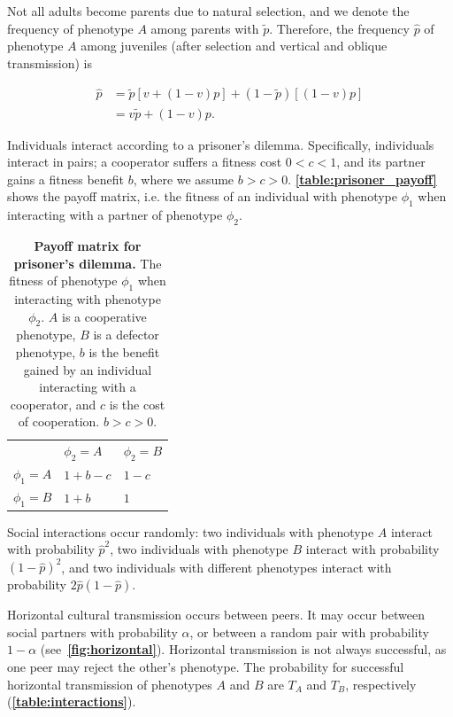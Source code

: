 \documentclass[12pt]{extarticle}
\begin{document}
Not all adults become parents due to natural selection, and we denote the frequency of phenotype $A$ among parents with $\tilde{p}$.
Therefore, the frequency $\hat{p}$ of  phenotype $A$ among juveniles (after selection and vertical and oblique transmission) is

\begin{equation}\label{eq:horizontal}
\begin{aligned}
\hat{p}
& = \tilde{p} [v + (1-v)p] + (1-\tilde{p}) [(1-v)p] \\
& = v \tilde{p} + (1-v) p.
\end{aligned}
\end{equation}

Individuals interact according to a prisoner's dilemma.
Specifically, individuals interact in pairs; a cooperator suffers a fitness cost $0<c<1$, and its partner gains a fitness benefit $b$, where we assume $b>c>0$. \textbf{\autoref{table:prisoner_payoff}} shows the payoff matrix, i.e. the fitness of an individual with phenotype $\phi_1$ when interacting with a partner of phenotype $\phi_2$.

\begin{table}[h]
\centering
\begin{tabular}{lll}
\toprule
           & $\phi_2=A$ & $\phi_2=B$ \\ \cmidrule(r){1-3}
$\phi_1=A$ & $1+b-c$ & $1-c$ \\
$\phi_1=B$ & $1+b$   & $1$
\\ \bottomrule
\end{tabular}
\caption{\textbf{Payoff matrix for prisoner's dilemma.}
The fitness of phenotype $\phi_1$ when interacting with phenotype $\phi_2$. $A$ is a cooperative phenotype, $B$ is a defector phenotype, $b$ is the benefit gained by an individual interacting with a cooperator, and $c$ is the cost of cooperation. $b>c>0$.
}
\label{table:prisoner_payoff}
\end{table}

Social interactions occur randomly:
two individuals with phenotype $A$ interact with probability $\hat{p}^2$, two individuals with phenotype $B$ interact with probability $(1-\hat{p})^2$, and two individuals with different phenotypes interact with probability $2\hat{p}(1-\hat{p})$. 

Horizontal cultural transmission occurs between peers. 
It may occur between social partners with probability $\alpha$, or between a random pair with probability $1-\alpha$ (see~\textbf{\autoref{fig:horizontal}}).
Horizontal transmission is not always successful, as one peer may reject the other's phenotype. The probability for successful horizontal transmission of phenotypes $A$ and $B$ are $T_A$ and $T_B$, respectively (\textbf{\autoref{table:interactions}}).
\end{document}
